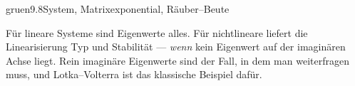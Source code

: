 \begin{loesungkarte}{gruen}{9.8}{System, Matrixexponential, Räuber--Beute}
\begin{mitnehmen}\kastentext
Für lineare Systeme sind Eigenwerte alles. Für nichtlineare liefert die Linearisierung Typ und Stabilität --- \emph{wenn} kein Eigenwert auf der imaginären Achse liegt. Rein imaginäre Eigenwerte sind der Fall, in dem man weiterfragen muss, und Lotka--Volterra ist das klassische Beispiel dafür.
\end{mitnehmen}
\end{loesungkarte}


